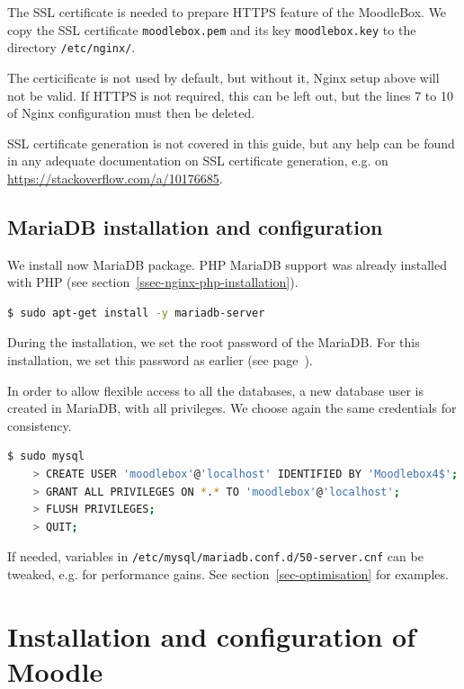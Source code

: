 \documentclass[12pt]{article}
\begin{document}
The SSL certificate is needed to prepare HTTPS feature of the MoodleBox.
We copy the SSL certificate \lstinline{moodlebox.pem} and its key \lstinline{moodlebox.key} to the directory \lstinline{/etc/nginx/}.

The certicificate is not used by default, but without it, Nginx setup above will not be valid.
If HTTPS is not required, this can be left out, but the lines 7 to 10 of Nginx configuration must then be deleted.

SSL certificate generation is not covered in this guide, but any help can be 
found in any adequate documentation on SSL certificate generation, e.g. on \url{https://stackoverflow.com/a/10176685}.

\subsection{MariaDB installation and configuration}

We install now MariaDB package.
PHP MariaDB support was already installed with PHP (see section~\ref{ssec-nginx-php-installation}).
\begin{lstlisting}[language=bash]
$ sudo apt-get install -y mariadb-server
\end{lstlisting}

During the installation, we set the root password of the MariaDB.
For this installation, we set this password as earlier (see page~\pageref{ssec-new-account}).

In order to allow flexible access to all the databases, a new database user is created in MariaDB, with all privileges.
We choose again the same credentials for consistency.

\begin{lstlisting}[language=bash]
$ sudo mysql
    > CREATE USER 'moodlebox'@'localhost' IDENTIFIED BY 'Moodlebox4$';
    > GRANT ALL PRIVILEGES ON *.* TO 'moodlebox'@'localhost';
    > FLUSH PRIVILEGES;
    > QUIT;
\end{lstlisting}

If needed, variables in \lstinline{/etc/mysql/mariadb.conf.d/50-server.cnf} can be tweaked, e.g. for performance gains. See section~\ref{sec-optimisation} for examples.

\section{Installation and configuration of Moodle}
\end{document}
